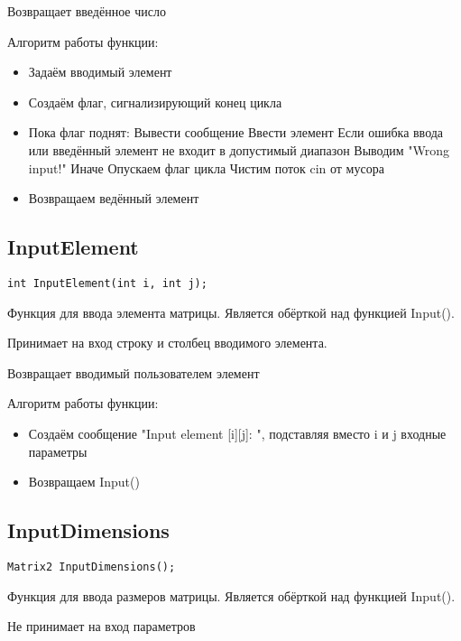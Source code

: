 Возвращает введённое число

Алгоритм работы функции:

\begin{itemize}
	\item Задаём вводимый элемент
	\item Создаём флаг, сигнализирующий конец цикла
	\item Пока флаг поднят:
	\subitem Вывести сообщение
	\subitem Ввести элемент
	\subitem Если ошибка ввода или введённый элемент не входит в допустимый диапазон
	\subsubitem Выводим "Wrong input!"
	\subitem Иначе
	\subsubitem Опускаем флаг цикла
	\subitem Чистим поток cin от мусора
	\item Возвращаем ведённый элемент
\end{itemize}

\subsection*{InputElement}

\begin{lstlisting}[label={lst:InputElement}]
	int InputElement(int i, int j);
\end{lstlisting}

Функция для ввода элемента матрицы.
Является обёрткой над функцией Input().

Принимает на вход строку и столбец вводимого элемента.

Возвращает вводимый пользователем элемент

Алгоритм работы функции:

\begin{itemize}
	\item Создаём сообщение "Input element [i][j]: ", подставляя вместо i и j входные параметры
	\item Возвращаем Input()
\end{itemize}

\subsection*{InputDimensions}

\begin{lstlisting}[label={lst:InputDimensions}]
	Matrix2 InputDimensions();
\end{lstlisting}

Функция для ввода размеров матрицы.
Является обёрткой над функцией Input().

Не принимает на вход параметров

